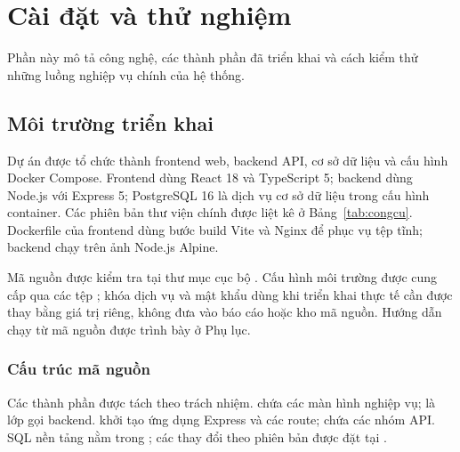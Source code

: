 \section{Cài đặt và thử nghiệm}
\label{sec:caidat}

\begin{muctieu}
Phần này mô tả công nghệ, các thành phần đã triển khai và cách kiểm thử
những luồng nghiệp vụ chính của hệ thống.
\end{muctieu}

\subsection{Môi trường triển khai}

Dự án được tổ chức thành frontend web, backend API, cơ sở dữ liệu và cấu
hình Docker Compose. Frontend dùng React 18 và TypeScript 5; backend dùng
Node.js với Express 5; PostgreSQL 16 là dịch vụ cơ sở dữ liệu trong cấu
hình container. Các phiên bản thư viện chính được liệt kê ở
Bảng~\ref{tab:congcu}. Dockerfile của frontend dùng bước build Vite và Nginx
để phục vụ tệp tĩnh; backend chạy trên ảnh Node.js Alpine.

Mã nguồn được kiểm tra tại thư mục cục bộ
. Cấu hình môi trường được cung cấp qua
các tệp ; khóa dịch vụ và mật khẩu dùng khi triển khai
thực tế cần được thay bằng giá trị riêng, không đưa vào báo cáo hoặc kho mã
nguồn. Hướng dẫn chạy từ mã nguồn được trình bày ở Phụ lục.

\subsubsection{Cấu trúc mã nguồn}
Các thành phần được tách theo trách nhiệm. 
chứa các màn hình nghiệp vụ;  là lớp
gọi backend.  khởi tạo ứng dụng Express và các
route;  chứa các nhóm API. SQL nền tảng nằm
trong ; các thay đổi theo phiên bản được đặt tại
.

